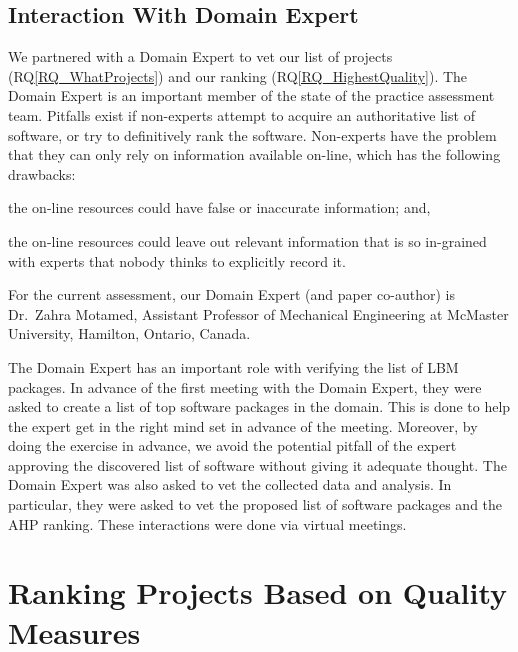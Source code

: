 \documentclass[final, 3p, times, authoryear]{elsarticle}
\newcommand{\rqref}[1]{RQ\ref{#1}}
\begin{document}
\subsection{Interaction With Domain Expert} \label{sec_vet_software_list}

We partnered with a Domain Expert to vet our list of projects
(\rqref{RQ_WhatProjects}) and our ranking (\rqref{RQ_HighestQuality}).  The
Domain Expert is an important member of the state of the practice assessment
team. Pitfalls exist if non-experts attempt to acquire an authoritative list of
software, or try to definitively rank the software. Non-experts have the problem
that they can only rely on information available on-line, which has the
following drawbacks:
\begin{inparaenum}[i)]
  \item the on-line resources could have false or inaccurate information; and,
  \item the on-line resources could leave out relevant information that is so
in-grained with experts that nobody thinks to explicitly record it.
\end{inparaenum}
For the current assessment, our Domain Expert (and paper co-author) is Dr.\
Zahra Motamed, Assistant Professor of Mechanical Engineering at McMaster
University, Hamilton, Ontario, Canada.  

The Domain Expert has an important role with verifying the list of LBM packages.
In advance of the first meeting with the Domain Expert, they were asked to
create a list of top software packages in the domain.  This is done to help the
expert get in the right mind set in advance of the meeting.  Moreover, by doing
the exercise in advance, we avoid the potential pitfall of the expert approving
the discovered list of software without giving it adequate thought.  The Domain
Expert was also asked to vet the collected data and analysis.  In particular,
they were asked to vet the proposed list of software packages and the AHP
ranking.  These interactions were done via virtual meetings.

\section{Ranking Projects Based on Quality Measures} \label{AHPresults}
\end{document}
